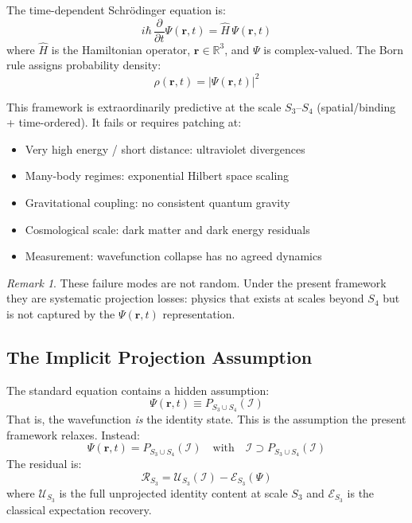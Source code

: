 \documentclass[11pt, a4paper, oneside]{article}
\theoremstyle{definition}
\theoremstyle{plain}
\theoremstyle{remark}
\newtheorem{remark}{Remark}[section]
\begin{document}
The time-dependent Schr\"{o}dinger equation is:
\begin{equation}
  i\hbar\,\frac{\partial}{\partial t}\Psi(\mathbf{r}, t)
  = \hat{H}\,\Psi(\mathbf{r}, t)
  \label{eq:TDSE}
\end{equation}
where $\hat{H}$ is the Hamiltonian operator, $\mathbf{r} \in \mathbb{R}^3$,
and $\Psi$ is complex-valued. The Born rule assigns probability density:
\begin{equation}
  \rho(\mathbf{r}, t) = |\Psi(\mathbf{r}, t)|^2
\end{equation}

This framework is extraordinarily predictive at the scale $S_3$--$S_4$
(spatial/binding + time-ordered). It fails or requires patching at:
\begin{itemize}
  \item Very high energy / short distance: ultraviolet divergences
  \item Many-body regimes: exponential Hilbert space scaling
  \item Gravitational coupling: no consistent quantum gravity
  \item Cosmological scale: dark matter and dark energy residuals
  \item Measurement: wavefunction collapse has no agreed dynamics
\end{itemize}

\begin{remark}
These failure modes are not random. Under the present framework they are
systematic projection losses: physics that exists at scales beyond $S_4$
but is not captured by the $\Psi(\mathbf{r},t)$ representation.
\end{remark}

\subsection{The Implicit Projection Assumption}

The standard equation contains a hidden assumption:
\begin{equation}
  \boxed{
	\Psi(\mathbf{r},t) \equiv P_{S_3 \cup S_4}(\mathcal{I})
  }
  \label{eq:implicit-projection}
\end{equation}
That is, the wavefunction \emph{is} the identity state. This is the
assumption the present framework relaxes. Instead:
\begin{equation}
  \Psi(\mathbf{r},t) = P_{S_3 \cup S_4}(\mathcal{I})
  \quad \text{with} \quad
  \mathcal{I} \supset P_{S_3 \cup S_4}(\mathcal{I})
  \label{eq:relaxed}
\end{equation}
The residual is:
\begin{equation}
  \mathcal{R}_{S_3} = \mathcal{U}_{S_3}(\mathcal{I}) - \mathcal{E}_{S_3}(\Psi)
  \label{eq:residual}
\end{equation}
where $\mathcal{U}_{S_3}$ is the full unprojected identity content at scale
$S_3$ and $\mathcal{E}_{S_3}$ is the classical expectation recovery.
\end{document}
